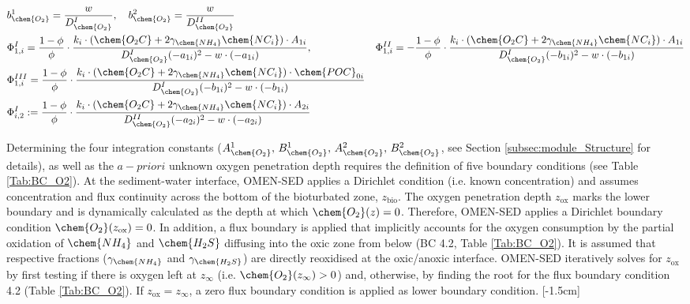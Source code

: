\documentclass[gmd, manuscript]{copernicus}
\begin{document}
\begin{align}
&b_{\chem{O_2}}^1 = \frac{w}{D_{\chem{O_2}}^{I}}, \quad b_{\chem{O_2}}^2 = \frac{w}{D_{\chem{O_2}}^{II}}\notag\\
&\Phi_{1,i}^I = \frac{1-\phi}{\phi}\cdot\frac{k_i\cdot(\chem{O_2C}+2 \gamma_{\chem{NH_4}} \chem{NC_i})\cdot A_{1i}}{D_{\chem{O_2}}^{I}(-a_{1i})^2-w\cdot (-a_{1i})}, &\Phi_{1,i}^{II} = - \frac{1-\phi}{\phi}\cdot\frac{k_i\cdot(\chem{O_2C}+2 \gamma_{\chem{NH_4}} \chem{NC_i})\cdot A_{1i}}{D_{\chem{O_2}}^{I}(-b_{1i})^2-w\cdot (-b_{1i})}\notag\\
&\Phi_{1,i}^{III} = \frac{1-\phi}{\phi}\cdot\frac{k_i\cdot(\chem{O_2C}+2 \gamma_{\chem{NH_4}} \chem{NC_i})\cdot \chem{POC}_{0i}}{D_{\chem{O_2}}^{I}(-b_{1i})^2-w\cdot (-b_{1i})} \notag\\
&\Phi_{i,2}^I := \frac{1-\phi}{\phi}\cdot\frac{k_i\cdot(\chem{O_2C}+2 \gamma_{\chem{NH_4}} \chem{NC_i})\cdot A_{2i}}{D_{\chem{O_2}}^{II}(-a_{2i})^2-w\cdot (-a_{2i})} \notag
\end{align}

Determining the four integration constants ($A_{\chem{O_2}}^1,\, B_{\chem{O_2}}^1,\, A_{\chem{O_2}}^2,\, B_{\chem{O_2}}^2$, see Section \ref{subsec:module_Structure} for details), as well as the $a-priori$ unknown oxygen penetration 
depth requires the definition of five boundary conditions (see Table \ref{Tab:BC_O2}). 
At the sediment-water interface, OMEN-SED applies a Dirichlet condition (i.e. known concentration) and assumes concentration and flux continuity across the bottom of the bioturbated zone, $z_{\mathrm{bio}}$. 
The oxygen penetration depth $z_{\mathrm{ox}}$ marks the lower boundary and is dynamically calculated as the depth at which $\chem{O_2}(z)=0$. 
Therefore, OMEN-SED applies a Dirichlet boundary condition $\chem{O_2}(z_{\mathrm{ox}})=0$. In addition, a flux boundary is applied that implicitly accounts for the oxygen consumption by the partial oxidation 
of $\chem{NH_4}$ and $\chem{H_2S}$ diffusing into the oxic zone from below (BC 4.2, Table \ref{Tab:BC_O2}). It is assumed that respective fractions ($\gamma_{\chem{NH_4}}$ and $\gamma_{\chem{H_2S}}$) are directly reoxidised 
at the oxic/anoxic interface. OMEN-SED iteratively solves for $z_{\mathrm{ox}}$ by first testing if there is oxygen left at $z_\infty$ (i.e. $\chem{O_2}(z_\infty) > 0$) and, otherwise, by finding the root for the flux 
boundary condition 4.2 (Table \ref{Tab:BC_O2}). If $z_{\mathrm{ox}}=z_\infty$,  a zero flux boundary condition is applied as lower boundary condition. 
[-1.5cm]%
\end{document}
